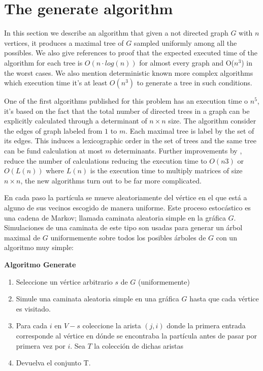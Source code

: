
\chapter{The generate algorithm} %

\label{AppendixA} %


In this section we describe an algorithm that given a not directed graph $G$ with $n$ vertices, it produces a maximal tree of $G$ sampled uniformly among all the possibles. We also give references to proof that the expected executed time of the algorithm for each tree is $O(n\cdot log(n) )$ for almost every graph and O($n^{3}$) in the worst cases. We also mention deterministic known more complex algorithms which execution time it's at least $O(n^{3})$ to generate a tree in such conditions.

One of the first algorithms published for this problem has an execution time o $n^{5}$, it's based on the fact that the total number of directed trees in a graph can be explicitly calculated through a determinant of $n \times n$ size. The algorithm consider the edges of graph labeled from $1$ to $m$. Each maximal tree is label by the set of its edges. This induces a lexicographic order in the set of trees and the same tree can be fund calculation at most $m$ determinants. Further improvements by \cite{CDN88}, \cite{CDM88} reduce the number of calculations reducing the execution time to  $O(n3)$ or $O(L(n))$ where $L(n)$ is the execution time to multiply  matrices of size $n\times n$, the new algorithms turn out to be far more complicated.

En cada paso la partícula se mueve aleatoriamente del vértice en el que está a alguno de sus vecinos escogido de manera uniforme. Este proceso estocástico es una cadena de Markov; llamada caminata aleatoria simple en la gráfica $G$. Simulaciones de una caminata de este tipo son usadas para generar un árbol maximal de $G$ uniformemente sobre todos los posibles árboles de $G$ con un algoritmo muy simple:

\begin{cajita}
\textbf{Algoritmo Generate}
\begin{enumerate}
\item Seleccione un vértice arbitrario $s$ de $G$ (uniformemente)
\item Simule una caminata aleatoria simple en una gráfica $G$ hasta que cada vértice es visitado.
\item Para cada $i$ en $V-s$ coleccione la arista $(j,i)$ donde la primera entrada corresponde al vértice en dónde se encontraba la partícula antes de pasar por primera vez por $i$. Sea $T$ la colección de dichas aristas
\item Devuelva el conjunto T.
\end{enumerate}
\end{cajita}

